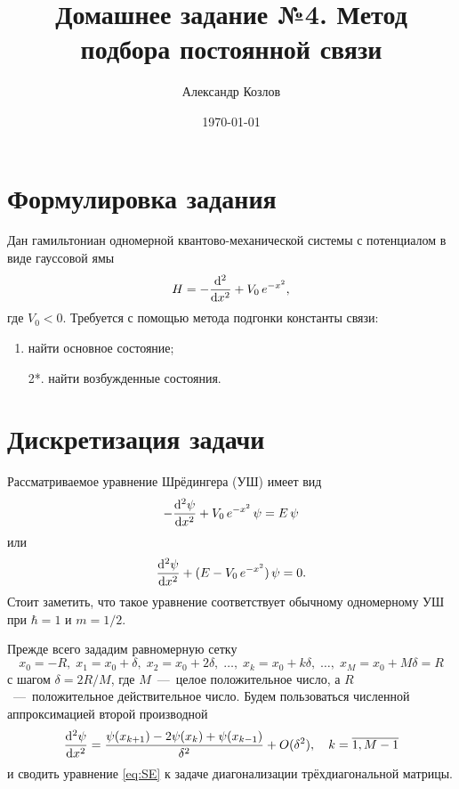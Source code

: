 \documentclass[10pt]{article}
\title{Домашнее задание №4. Метод подбора постоянной связи}
\author{Александр Козлов}
\date{\today}
\begin{document}
\maketitle

\section*{Формулировка задания}

Дан гамильтониан одномерной квантово-механической системы с потенциалом в виде гауссовой ямы
\begin{equation}
    H = - \dv[2]{}{x} + V_0\, e^{-x^2},
\end{equation}
где $V_0 < 0$. Требуется с помощью метода подгонки константы связи:
\begin{enumerate}
 \item найти основное состояние;
 \item[2*.] найти возбужденные состояния.
\end{enumerate}


\section{Дискретизация задачи}

Рассматриваемое уравнение Шрёдингера (УШ) имеет вид
\begin{equation}
    -\dv[2]{\psi}{x} + V_0\, e^{-x^2}\, \psi  = E\, \psi
    \label{eq:SE}
\end{equation}
или
\begin{equation}
    \dv[2]{\psi}{x}  + (E - V_0\, e^{-x^2})\, \psi  = 0.
\end{equation}
Стоит заметить, что такое уравнение соответствует обычному одномерному УШ при $\hbar=1$ и $m=1/2$.

Прежде всего зададим равномерную сетку
\begin{equation}
    x_0 = -R,\; x_1 = x_0 + \delta,\; x_2 = x_0 + 2\delta,\; \ldots,\; x_k = x_0 + k\delta,\; \ldots,\; x_M = x_0 + M \delta = R
\end{equation}
с шагом $\delta = 2R/M$, где $M$~---~целое положительное число, а $R$~---~положительное действительное число. Будем пользоваться численной аппроксимацией второй производной
\begin{equation}
    \dv[2]{\psi}{x}(x_k) = \dfrac{\psi(x_{k+1}) - 2\psi(x_{k}) + \psi(x_{k-1})}{\delta^2} + O(\delta^2),\quad k = \overline{1,M-1}
\end{equation}
и сводить уравнение \eqref{eq:SE} к задаче диагонализации трёхдиагональной матрицы.
\end{document}
